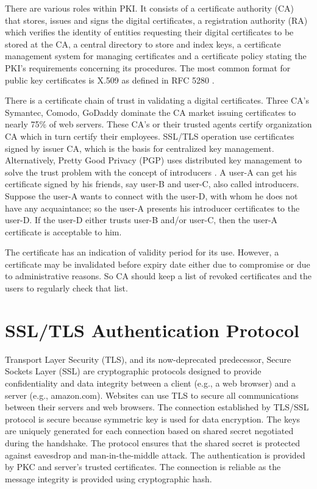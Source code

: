 \begin{multicols}{2}
There are various roles within PKI. It consists of a certificate authority (CA) that stores, issues and signs the digital certificates, a registration authority (RA) which verifies the identity of entities requesting their digital certificates to be stored at the CA, a central directory to store and index keys, a certificate management system for managing certificates and a certificate policy stating the PKI's requirements concerning its procedures. The most common format for public key certificates is X.509 as defined in RFC 5280 \cite{chap2-key15}.

There is a certificate chain of trust in validating a digital certificates. Three CA's Symantec, Comodo, GoDaddy dominate the CA market issuing certificates to nearly 75\% of web servers. These CA's or their trusted agents certify organization CA which in turn certify their employees. SSL/TLS operation use certificates signed by issuer CA, which is the basis for centralized key management. Alternatively, Pretty Good Privacy (PGP) uses distributed key management to solve the trust problem with the concept of introducers \cite{chap2-key1}. A user-A can get his certificate signed by his friends, say user-B and user-C, also called introducers. Suppose the user-A wants to connect with the user-D, with whom he does not have any acquaintance; so the user-A presents his introducer certificates to the user-D. If the user-D either trusts user-B and/or user-C, then the user-A certificate is acceptable to him.

The certificate has an indication of validity period for its use. However, a certificate may be invalidated before expiry date either due to compromise or due to administrative reasons. So CA should keep a list of revoked certificates and the users to regularly check that list.\\[-21pt]

\section{SSL/TLS Authentication Protocol}

\vskip -3pt

Transport Layer Security (TLS), and its now-deprecated predecessor, Secure Sockets Layer (SSL) are cryptographic protocols designed to provide confidentiality and data integrity between a client (e.g., a web browser) and a server (e.g., amazon.com). Websites can use TLS to secure all communications between their servers and web browsers. The connection established by TLS/SSL protocol is secure because symmetric key is used for data encryption. The keys are uniquely generated for each connection based on shared secret negotiated during the handshake. The protocol ensures that the shared secret is protected against eavesdrop and man-in-the-middle attack. The authentication is provided by PKC and server's trusted certificates. The connection is reliable as the message integrity is provided using cryptographic hash.


\end{multicols}
